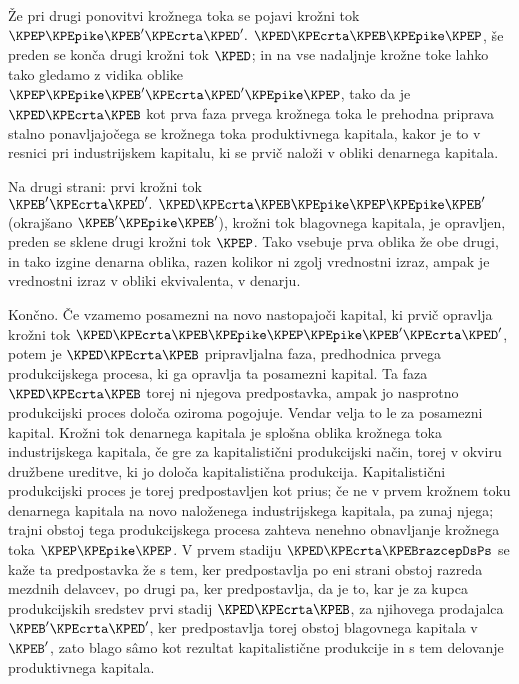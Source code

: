 \documentclass[kapital_02.tex]{subfiles}
\begin{document}
Že pri drugi ponovitvi krožnega toka se pojavi krožni tok \( \KPEP \KPEpike \KPEB' \KPEcrta \KPED'\textrm{. } \KPED \KPEcrta \KPEB \KPEpike \KPEP \), še preden se konča drugi krožni tok \( \KPED \); in na vse nadaljnje krožne toke lahko tako gledamo z vidika oblike \( \KPEP \KPEpike \KPEB' \KPEcrta \KPED' \KPEpike \KPEP \), tako da je \( \KPED \KPEcrta \KPEB \) kot prva faza prvega krožnega toka le prehodna priprava stalno ponavljajočega se krožnega toka produktivnega kapitala, kakor je to v resnici pri industrijskem kapitalu, ki se prvič naloži v obliki denarnega kapitala.

Na drugi strani: prvi krožni tok \( \KPEB' \KPEcrta \KPED'\textrm{. } \KPED \KPEcrta \KPEB \KPEpike \KPEP \KPEpike \KPEB' \) (okrajšano \( \KPEB' \KPEpike \KPEB' \)), krožni tok blagovnega kapitala, je opravljen, preden se sklene drugi krožni tok \( \KPEP \). Tako vsebuje prva oblika že obe drugi, in tako izgine denarna oblika, razen kolikor ni zgolj vrednostni izraz, ampak je vrednostni izraz v obliki ekvivalenta, v denarju.

Končno. Če vzamemo posamezni na novo nastopajoči kapital, ki prvič opravlja krožni tok \( \KPED \KPEcrta \KPEB \KPEpike \KPEP \KPEpike \KPEB' \KPEcrta \KPED' \), potem je \( \KPED \KPEcrta \KPEB \) pripravljalna faza, predhodnica prvega produkcijskega procesa, ki ga opravlja ta posamezni kapital. Ta faza \( \KPED \KPEcrta \KPEB \) torej ni njegova predpostavka, ampak jo nasprotno produkcijski proces določa oziroma pogojuje. Vendar velja to le za posamezni kapital. Krožni tok denarnega kapitala je splošna oblika krožnega toka industrijskega kapitala, če gre za kapitalistični produkcijski način, torej v okviru družbene ureditve, ki jo določa kapitalistična produkcija. Kapitalistični produkcijski proces je torej predpostavljen kot prius; če ne v prvem krožnem toku denarnega kapitala na novo naloženega industrijskega kapitala, pa zunaj njega; trajni obstoj tega produkcijskega procesa zahteva nenehno obnavljanje krožnega toka \( \KPEP \KPEpike \KPEP \). V prvem stadiju \( \KPED \KPEcrta \KPEBrazcepDsPs \) se kaže ta predpostavka že s tem, ker predpostavlja po eni strani obstoj razreda mezdnih delavcev, \KPEstran po drugi pa, ker predpostavlja, da je to, kar je za kupca produkcijskih sredstev prvi stadij \( \KPED \KPEcrta \KPEB \), za njihovega prodajalca \( \KPEB' \KPEcrta \KPED' \), ker predpostavlja torej obstoj blagovnega kapitala v \( \KPEB' \), zato blago s\^amo kot rezultat kapitalistične produkcije in s tem delovanje produktivnega kapitala.
\end{document}
